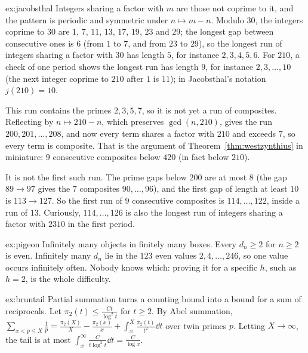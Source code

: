 \begin{solution}{ex:jacobsthal}
\idea Integers sharing a factor with $m$ are those not coprime to it, and the pattern is periodic and symmetric under $n\mapsto m-n$.
\writeup Modulo $30$, the integers coprime to $30$ are $1$, $7$, $11$, $13$, $17$, $19$, $23$ and $29$; the longest gap between consecutive ones is $6$ (from $1$ to $7$, and from
$23$ to $29$), so the longest run of integers sharing a factor with $30$ has length $5$, for instance $2,3,4,5,6$. For $210$, a check of one period shows
the longest run has length $9$, for instance $2,3,\dots,10$ (the next integer coprime to $210$ after $1$ is $11$); in Jacobsthal's notation $j(210)=10$.

This run contains the primes $2,3,5,7$, so it is not yet a run of composites. Reflecting by $n\mapsto210-n$, which preserves $\gcd(n,210)$, gives the run
$200,201,\dots,208$, and now every term shares a factor with $210$ and exceeds $7$, so every term is composite. That is the argument of
Theorem~\ref{thm:westzynthius} in miniature: $9$ consecutive composites below $420$ (in fact below $210$).

It is not the first such run. The prime gaps below $200$ are at most $8$ (the gap $89\to97$ gives the $7$ composites $90,\dots,96$), and the first gap of
length at least $10$ is $113\to127$. So the first run of $9$ consecutive composites is $114,\dots,122$, inside a run of $13$. Curiously, $114,\dots,126$ is
also the longest run of integers sharing a factor with $2310$ in the first period.
\end{solution}

\begin{solution}{ex:pigeon}
\idea Infinitely many objects in finitely many boxes.
\writeup Every $d_n\ge2$ for $n\ge2$ is even. Infinitely many $d_n$ lie in the $123$ even values $2,4,\dots,246$, so one value occurs infinitely often.
Nobody knows which: proving it for a specific $h$, such as $h=2$, is the whole difficulty.
\end{solution}

\begin{solution}{ex:bruntail}
\idea Partial summation turns a counting bound into a bound for a sum of reciprocals.
\writeup Let $\pi_2(t)\le\frac{Ct}{\log^2t}$ for $t\ge2$. By Abel summation, $\sum_{x<p\le X}\frac1p=\frac{\pi_2(X)}X-\frac{\pi_2(x)}x+\int_x^X\frac{\pi_2(t)}{t^2}\dd t$
over twin primes $p$. Letting $X\to\infty$, the tail is at most $\int_x^\infty\frac C{t\log^2t}\dd t=\frac C{\log x}$.
\end{solution}

